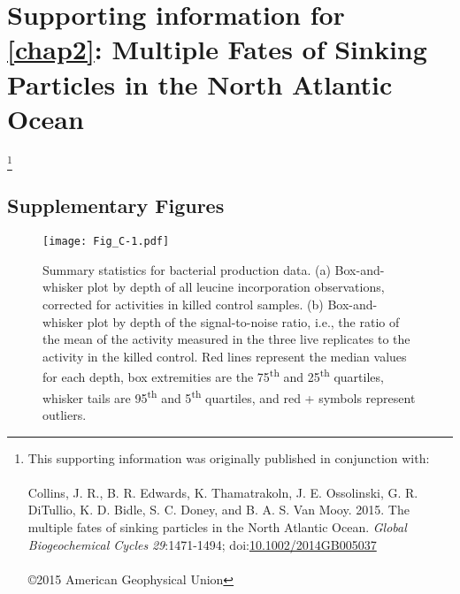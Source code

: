 
\begingroup%
\makeatletter%
\cleardoublepage%
\let\newpage\relax%
\let\clearpage\relax%
\vspace*{\fill}%
\vspace*{\dimexpr-50\p@-\baselineskip}%
\chapter[Supporting information for Chapter 2]{{\setlength{\huge} Supporting information for}\\ \autoref{chap2}: Multiple Fates of Sinking Particles in the North Atlantic Ocean}
\label{AppC}
\let\thefootnote\relax\footnote{{\setlength{\parindent}{0pt}This supporting information was originally published in conjunction with:\\\\Collins, J. R., B. R. Edwards, K. Thamatrakoln, J. E. Ossolinski, G. R. DiTullio, K. D. Bidle, S. C. Doney, and B. A. S. Van Mooy. 2015. The multiple fates of sinking particles in the North Atlantic Ocean. \emph{Global Biogeochemical Cycles} \emph{29}:1471-1494; doi:\href{http://dx.doi.org/10.1002/2014GB005037}{10.1002/2014GB005037}\\\\\copyright 2015 American Geophysical Union}}
\vspace*{\fill}%
\endgroup%

\clearpage

\section{Supplementary Figures}

\begin{figure}[!th]
\centering
\texttt{[image: Fig\_C-1.pdf]}
\caption[Summary statistics for bacterial production data]{Summary statistics for bacterial production data. (a) Box-and-whisker plot by depth of all leucine incorporation observations, corrected for activities in killed control samples. (b) Box-and-whisker plot by depth of the signal-to-noise ratio, i.e., the ratio of the mean of the activity measured in the three live replicates to the activity in the killed control. Red lines represent the median values for each depth, box extremities are the 75\textsuperscript{th} and 25\textsuperscript{th} quartiles, whisker tails are 95\textsuperscript{th} and 5\textsuperscript{th} quartiles, and red + symbols represent outliers.
}
\label{fig:acn1}
\end{figure}

